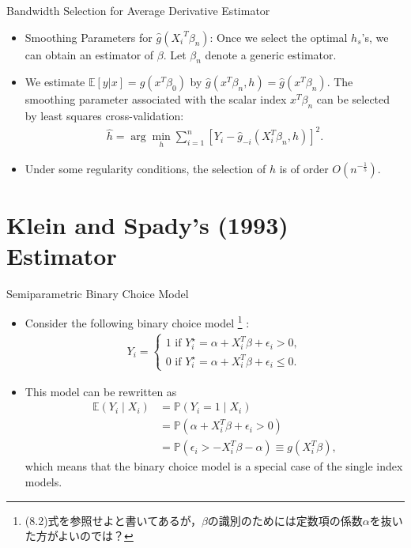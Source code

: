 \documentclass[xcolor=svgnames,dvipdfmx,cjk]{beamer}
\theoremstyle{example}
\def\E{\mathbb{E}}
\def\P{\mathbb{P}}
\begin{document}
\begin{frame}{Bandwidth Selection for Average Derivative Estimator}
\begin{itemize}
  \item \alert{Smoothing Parameters for $\hat{g}({X_i}^T\beta_n)$}: 
        Once we select the optimal $h_s$'s, we can obtain an estimator of $\beta$.
        Let $\beta_n$ denote a generic estimator.
  \item We estimate $\E[y|x] = g(x^T\beta_0)$ by $\hat{g}(x^T\beta_n, h) = \hat{g}(x^T\beta_n)$.
        The smoothing parameter associated with the scalar index $x^T \beta_n$ can be selected by least squares cross-validation:
        \begin{align*}
          \hat{h} = \arg\min_{h} \sum_{i=1}^{n} [Y_i - \hat{g}_{-i}(X_i^T\beta_n, h)]^2.
        \end{align*}
  \item Under some regularity conditions, the selection of $h$ is of order $O(n^{-\frac{1}{5}})$.
\end{itemize}
\end{frame}

 
  
\section{Klein and Spady's (1993) Estimator}
  
\begin{frame}{Semiparametric Binary Choice Model}
 \begin{itemize}
  \item Consider the following binary choice model
        \footnote{(8.2)式を参照せよと書いてあるが，$\beta$の識別のためには定数項の係数$\alpha$を抜いた方がよいのでは？}
        :
        \begin{align*}
          Y_i = \left\{
            \begin{array}{l}
              1 \text{ if } Y_i^{\star} = \alpha + X_i^T \beta + \epsilon_i > 0, 
              \\ 
              0 \text{ if } Y_i^{\star} = \alpha + X_i^T \beta + \epsilon_i \leq 0.
            \end{array}
            \right.
        \end{align*}
  \item This model can be rewritten as
        \begin{align*}
          \E(Y_i \mid X_i) 
          &= \P(Y_i = 1 \mid X_i)\\
          &= \P( \alpha + X_i^T \beta + \epsilon_i > 0)\\
          &= \P(\epsilon_i > -X_i^T \beta - \alpha)
          \equiv g(X_i^T\beta),
        \end{align*}
        which means that the binary choice model is a special case of the single index models.
 \end{itemize} 
\end{frame} 
  
\end{document}
